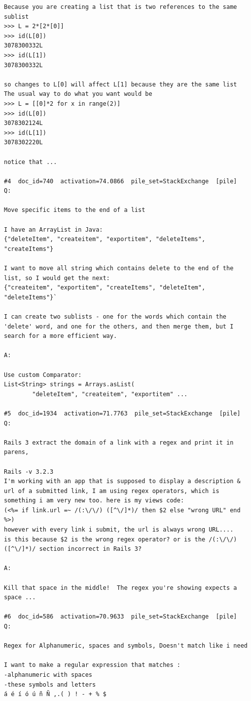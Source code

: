 \begin{verbatim}
Because you are creating a list that is two references to the same sublist
>>> L = 2*[2*[0]]
>>> id(L[0])
3078300332L
>>> id(L[1])
3078300332L

so changes to L[0] will affect L[1] because they are the same list
The usual way to do what you want would be
>>> L = [[0]*2 for x in range(2)]
>>> id(L[0])
3078302124L
>>> id(L[1])
3078302220L

notice that ...

#4  doc_id=740  activation=74.0866  pile_set=StackExchange  [pile]
Q:

Move specific items to the end of a list

I have an ArrayList in Java: 
{"deleteItem", "createitem", "exportitem", "deleteItems", "createItems"}

I want to move all string which contains delete to the end of the list, so I would get the next:
{"createitem", "exportitem", "createItems", "deleteItem", "deleteItems"}`

I can create two sublists - one for the words which contain the 'delete' word, and one for the others, and then merge them, but I search for a more efficient way. 

A:

Use custom Comparator:
List<String> strings = Arrays.asList(
        "deleteItem", "createitem", "exportitem" ...

#5  doc_id=1934  activation=71.7763  pile_set=StackExchange  [pile]
Q:

Rails 3 extract the domain of a link with a regex and print it in parens,

Rails -v 3.2.3
I'm working with an app that is supposed to display a description & url of a submitted link, I am using regex operators, which is something i am very new too. here is my views code:
(<%= if link.url =~ /(:\/\/) ([^\/]*)/ then $2 else "wrong URL" end %>)
however with every link i submit, the url is always wrong URL.... 
is this because $2 is the wrong regex operator? or is the /(:\/\/) ([^\/]*)/ section incorrect in Rails 3?

A:

Kill that space in the middle!  The regex you're showing expects a space ...

#6  doc_id=586  activation=70.9633  pile_set=StackExchange  [pile]
Q:

Regex for Alphanumeric, spaces and symbols, Doesn't match like i need

I want to make a regular expression that matches :
-alphanumeric with spaces 
-these symbols and letters 
á é í ó ú ñ Ñ ,.( ) ! - + % $


\end{verbatim}
